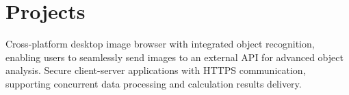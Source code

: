 

\section{Projects}\label{sec:projects}
\resumeSubHeadingListStart
        {Cross-platform desktop image browser with integrated object recognition, enabling users to seamlessly send images to an external API for advanced object analysis.}
        {Secure client-server applications with HTTPS communication, supporting concurrent data processing and calculation results delivery.}
\resumeSubHeadingListEnd
